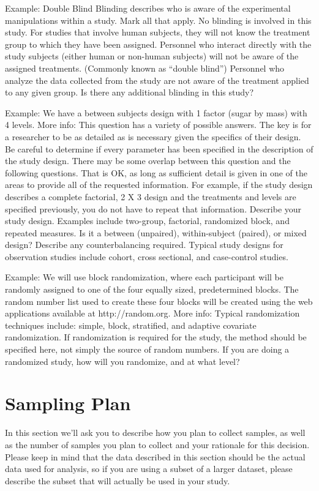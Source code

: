 \documentclass[highlight, explanations]{prereg}
\begin{document}
{Example: Double Blind}
{Blinding describes who is aware of the experimental manipulations within a study. Mark all that apply.
No blinding is involved in this study.
For studies that involve human subjects, they will not know the treatment group to which they have been assigned.
Personnel who interact directly with the study subjects (either human or non-human subjects) will not be aware of the assigned treatments. (Commonly known as “double blind”)
Personnel who analyze the data collected from the study are not aware of the treatment applied to any given group.
Is there any additional blinding in this study?
}

{Example: We have a between subjects design with 1 factor (sugar by mass) with 4 levels. 
More info: This question has a variety of possible answers. The key is for a researcher to be as detailed as is necessary given the specifics of their design. Be careful to determine if every parameter has been specified in the description of the study design. There may be some overlap between this question and the following questions. That is OK, as long as sufficient detail is given in one of the areas to provide all of the requested information. For example, if the study design describes a complete factorial, 2 X 3 design and the treatments and levels are specified previously, you do not have to repeat that information.}
{Describe your study design. Examples include two-group, factorial, randomized block, and repeated measures. Is it a between (unpaired), within-subject (paired), or mixed design? Describe any counterbalancing required. Typical study designs for observation studies include cohort, cross sectional, and case-control studies.
}

{Example: We will use block randomization, where each participant will be randomly assigned to one of the four equally sized, predetermined blocks. The random number list used to create these four blocks will be created using the web applications available at http://random.org. 
More info: Typical randomization techniques include: simple, block, stratified, and adaptive covariate randomization. If randomization is required for the study, the method should be specified here, not simply the source of random numbers.}
{If you are doing a randomized study, how will you randomize, and at what level?
}

\section{Sampling Plan}
In this section we’ll ask you to describe how you plan to collect samples, as well as the number of samples you plan to collect and your rationale for this decision. Please keep in mind that the data described in this section should be the actual data used for analysis, so if you are using a subset of a larger dataset, please describe the subset that will actually be used in your study.
\end{document}
